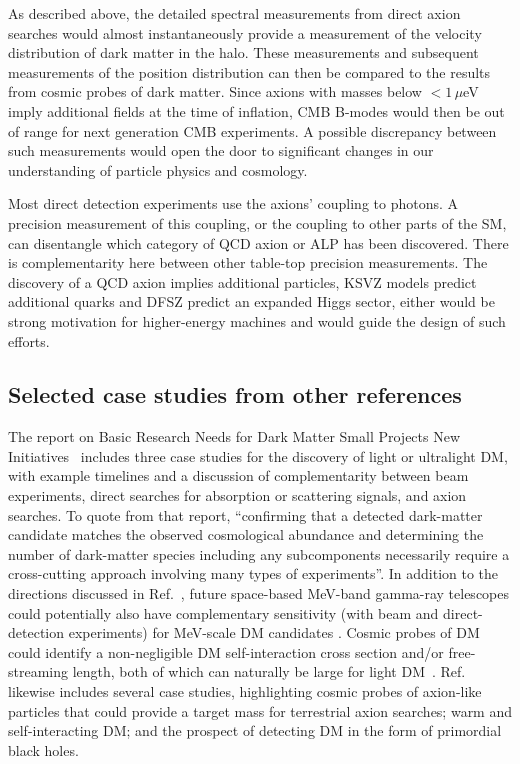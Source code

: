 \documentclass[nofootinbib]{article}
\begin{document}
As described above, the detailed spectral measurements from direct axion searches would almost instantaneously provide a measurement of the velocity distribution of dark matter in the halo. These measurements and subsequent measurements of the position distribution can then be compared to the results from cosmic probes of dark matter.  Since axions with masses below $< 1\,\mu$eV imply additional fields at the time of inflation, CMB B-modes would then be out of range for next generation CMB experiments. A possible discrepancy between such measurements would open the door to significant changes in our understanding of particle physics and cosmology.

Most direct detection experiments use the axions' coupling to photons. A precision measurement of this coupling, or the coupling to other parts of the SM, can disentangle which category of QCD axion or ALP has been discovered. There is complementarity here between other table-top precision measurements. The discovery of a QCD axion implies additional particles, KSVZ models predict additional quarks and DFSZ predict an expanded Higgs sector, either would be strong motivation for higher-energy machines and would guide the design of such efforts.






\subsection{Selected case studies from other references}

The report on Basic Research Needs for Dark Matter Small Projects New Initiatives~\cite{BRNreport} includes three case studies for the discovery of light or ultralight DM, with example timelines and a discussion of complementarity between beam experiments, direct searches for absorption or scattering signals, and axion searches. To quote from that report, ``confirming that a detected dark-matter candidate matches the observed cosmological abundance and determining the number of dark-matter species including any subcomponents necessarily require a cross-cutting approach involving many types of experiments''. In addition to the directions discussed in Ref.~\cite{BRNreport}, future space-based MeV-band gamma-ray telescopes could potentially also have complementary sensitivity (with beam and direct-detection experiments) for MeV-scale DM candidates \cite{Coogan:2021sjs}. 
Cosmic probes of DM could identify a non-negligible DM self-interaction cross section and/or free-streaming length, both of which can naturally be large for light DM~\cite{Drlica-Wagner:2022lbd}.
Ref.~\cite{Drlica-Wagner:2022lbd} likewise includes several case studies, highlighting cosmic probes of axion-like particles that could provide a target mass for terrestrial axion searches; warm and self-interacting DM; and the prospect of detecting DM in the form of primordial black holes.
\end{document}
